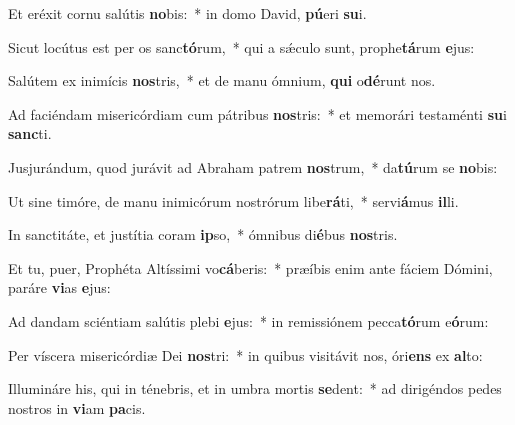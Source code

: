 \item Et eréxit cornu salútis \textbf{no}bis:~* in domo David, \textbf{pú}eri \textbf{su}i.
\item Sicut locútus est per os sanc\textbf{tó}rum,~* qui a sǽculo sunt, prophe\textbf{tá}rum \textbf{e}jus:
\item Salútem ex inimícis \textbf{nos}tris,~* et de manu ómnium, \textbf{qui} o\textbf{dé}runt nos.
\item Ad faciéndam misericórdiam cum pátribus \textbf{nos}tris:~* et memorári testaménti \textbf{su}i \textbf{sanc}ti.
\item Jusjurándum, quod jurávit ad Abraham patrem \textbf{nos}trum,~* da\textbf{tú}rum se \textbf{no}bis:
\item Ut sine timóre, de manu inimicórum nostrórum libe\textbf{rá}ti,~* servi\textbf{á}mus \textbf{il}li.
\item In sanctitáte, et justítia coram \textbf{ip}so,~* ómnibus di\textbf{é}bus \textbf{nos}tris.
\item Et tu, puer, Prophéta Altíssimi vo\textbf{cá}beris:~* præíbis enim ante fáciem Dómini, paráre \textbf{vi}as \textbf{e}jus:
\item Ad dandam sciéntiam salútis plebi \textbf{e}jus:~* in remissiónem pecca\textbf{tó}rum e\textbf{ó}rum:
\item Per víscera misericórdiæ Dei \textbf{nos}tri:~* in quibus visitávit nos, óri\textbf{ens} ex \textbf{al}to:
\item Illumináre his, qui in ténebris, et in umbra mortis \textbf{se}dent:~* ad dirigéndos pedes nostros in \textbf{vi}am \textbf{pa}cis.
